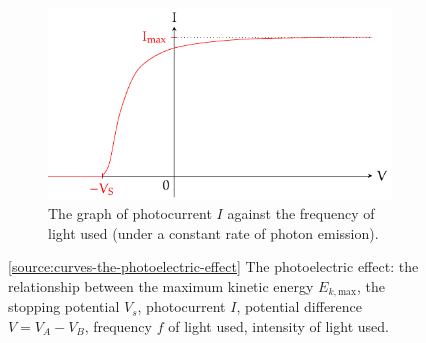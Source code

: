 \documentclass[oneside]{book}
\begin{document}
\begin{figure}[H]
\begin{subfigure}[c]{0.49\textwidth}
        \centering
        \includegraphics[width=\textwidth,page=7]{../images/The-Photoelectric-Effect/The-Photoelectric-Effect.pdf}
        \caption{The graph of photocurrent \(I\) against the frequency of light used (under a constant rate of photon emission).}
    \end{subfigure}\hfill
    \caption{\ref{source:curves-the-photoelectric-effect} The photoelectric effect: the relationship between the maximum kinetic energy \(E_{k,\text{max}}\), the stopping potential \(V_s\), photocurrent \(I\), potential difference \(V=V_A-V_B\), frequency \(f\) of light used, intensity of light used.}
    \label{fig:curves-TOO-the-photoelectric-effect}
\end{figure}
\end{document}
